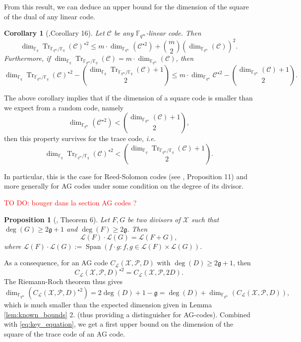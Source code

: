 \documentclass[a4paper]{article}
\newtheorem{proposition}[thm]{Proposition}
\newtheorem{coro}[thm]{Corollary}
\theoremstyle{definition}
\theoremstyle{remark}
\newcommand{\calP}{\mathcal{P}}
\newcommand{\calL}{\mathcal{L}}
\newcommand{\calC}{\mathcal{C}}
\newcommand{\calX}{\mathcal{X}}
\newcommand{\fqm}{\mathbb{F}_{q^m}}
\newcommand{\fq}{\mathbb{F}_{q}}
\newcommand{\Tr}[1]{\operatorname{Tr}_{\mathbb{F}_{q^m}/\fq}\left(#1\right)}
\newcommand{\Span}[1]{\operatorname{Span}\left(#1\right)}
\newcommand\TODO[1]{\textcolor{red}{TO DO: #1}}
\begin{document}
From this result, we can deduce an upper bound for the dimension of the square of the dual of any linear code.

\begin{coro} [\cite{MT21},Corollary 16]\label{coro:first_bound_square_of_trace}
Let $\calC$ be any $\fqm$-linear code. Then 
\begin{equation} \label{eq:mumford_bound}
    \dim_{\fq}\Tr{\calC}^{\star2} \leq m \cdot \dim_{\fqm}(\calC^{\star 2}) + \binom{m}{2} (\dim_{\fqm}(\calC))^2.
\end{equation}
Furthermore, if $\dim_{\fq} \Tr{\calC} = m \cdot \dim_{\fqm}(\calC)$, then 
\[\dim_{\fq} \Tr{\calC}^{\star2} - \binom{\dim_{\fq} \Tr{\calC}+1}{2} \leq m \cdot \dim_{\fqm} \calC^{\star 2} - \binom{\dim_{\fqm} (\calC)+1}{2}.\]
\end{coro}

The above corollary implies that if the dimension of a square code is smaller than we expect from a random code, namely
\[ \dim_{\fqm} (\calC^{\star 2}) < \binom{\dim_{\fqm} (\calC)+1}{2},\]
then this property survives for the trace code, \emph{i.e.}
\[\dim_{\fq} \Tr{\calC}^{\star 2} < \binom{\dim_{\fq} \Tr{\calC}+1}{2}.\]

In particular, this is the case for Reed-Solomon codes (see \cite{MT21}, Proposition 11) and more generally for AG codes under some condition on the degree of its divisor.

\TODO{bouger dans la section AG codes ?}

\begin{proposition}[\cite{Mum70}, Theorem 6] \label{prop:mumford_result}
Let $F,G$ be two divisors of $\calX$ such that $\deg(G) \geq 2\mathfrak{g}+1$ and $\deg(F) \geq 2\mathfrak{g}$. Then
\[ \calL(F) \cdot \calL(G) = \calL(F+G),\]
where $\calL(F) \cdot \calL(G) := \Span{ f \cdot g : f,g \in \calL(F) \times \calL(G)}$.
\end{proposition}

\noindent As a consequence, for an AG code  $C_{\calL}(\calX,\mathcal{P},D)$ with $\deg(D) \geq 2\mathfrak{g}+1$, then 
\[ C_{\calL}(\calX,\mathcal{P},D)^{\star2} = C_{\calL}(\calX,\calP,2D).\]
The Riemann-Roch theorem thus gives
\[ \dim_{\fqm}(C_{\calL}(\calX,\mathcal{P},D)^{\star2}) = 2\deg(D)+1-\mathfrak{g}= \deg(D) + \dim_{\fqm}(C_{\calL}(\calX,\mathcal{P},D)), \]
which is much smaller than the expected dimension given in Lemma \ref{lem:known_bounds} 2. (thus providing a distinguisher for AG-codes). Combined with \eqref{eq:key_equation}, we get a first upper bound on the dimension of the square of the trace code of an AG code.
\end{document}
